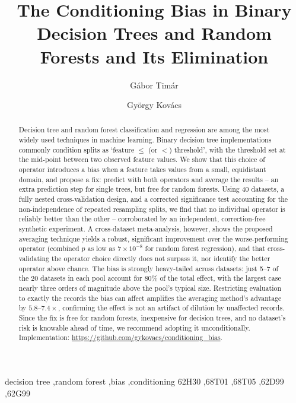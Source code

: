 \documentclass[5p,twocolumn,authoryear]{elsarticle}
\theoremstyle{plain}%
\theoremstyle{remark}%
\theoremstyle{definition}%
\begin{document}
\begin{frontmatter}

\title{The Conditioning Bias in Binary Decision Trees and Random Forests and Its Elimination}

\author[1]{G\'abor Tim\'ar}

\author[2]{Gy\"orgy Kov\'acs}

\address[1]{Departamento de F\'isica, Universidade de Aveiro \& I3N, Campus Universit\'ario de Santiago, Aveiro, 3810-193, Portugal}

\address[2]{Analytical Minds Ltd., \'Arp\'ad street 5., Beregsur\'any, 4933, Hungary}

\begin{abstract}
Decision tree and random forest classification and regression are among the most widely used techniques in machine learning. Binary decision tree implementations commonly condition splits as `feature $\leq$ (or $<$) threshold', with the threshold set at the mid-point between two observed feature values. We show that this choice of operator introduces a bias when a feature takes values from a small, equidistant domain, and propose a fix: predict with both operators and average the results -- an extra prediction step for single trees, but free for random forests. Using 40 datasets, a fully nested cross-validation design, and a corrected significance test accounting for the non-independence of repeated resampling splits, we find that no individual operator is reliably better than the other -- corroborated by an independent, correction-free synthetic experiment. A cross-dataset meta-analysis, however, shows the proposed averaging technique yields a robust, significant improvement over the worse-performing operator (combined $p$ as low as $7\times10^{-8}$ for random forest regression), and that cross-validating the operator choice directly does not surpass it, nor identify the better operator above chance. The bias is strongly heavy-tailed across datasets: just 5--7 of the 20 datasets in each pool account for 80\% of the total effect, with the largest case nearly three orders of magnitude above the pool's typical size. Restricting evaluation to exactly the records the bias can affect amplifies the averaging method's advantage by $5.8$--$7.4\times$, confirming the effect is not an artifact of dilution by unaffected records. Since the fix is free for random forests, inexpensive for decision trees, and no dataset's risk is knowable ahead of time, we recommend adopting it unconditionally. Implementation: \url{https://github.com/gykovacs/conditioning_bias}.
\end{abstract}

\begin{keyword}
decision tree \sep random forest \sep bias \sep conditioning
\MSC[2020] 62H30 \sep 68T01 \sep 68T05 \sep 62D99 \sep 62G99
\end{keyword}

\end{frontmatter}
\end{document}
